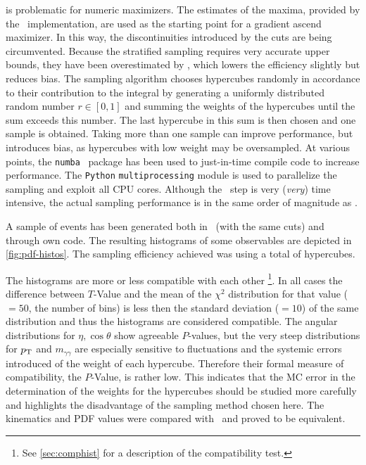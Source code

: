is problematic for numeric maximizers.  The estimates of the maxima,
provided by the \vegas\ implementation, are used as the starting point
for a gradient ascend maximizer. In this way, the discontinuities
introduced by the cuts are being circumvented. Because the stratified
sampling requires very accurate upper bounds, they have been
overestimated by \!, which lowers
the efficiency slightly but reduces bias. The sampling algorithm
chooses hypercubes randomly in accordance to their contribution to the
integral by generating a uniformly distributed random number
\(r\in [0,1]\) and summing the weights of the hypercubes until the sum
exceeds this number. The last hypercube in this sum is then chosen and
one sample is obtained. Taking more than one sample can improve
performance, but introduces bias, as hypercubes with low weight may be
oversampled. At various points, the \texttt{numba}~\cite{lam2015:po}
package has been used to just-in-time compile code to increase
performance. The \texttt{Python} \texttt{multiprocessing} module is
used to parallelize the sampling and exploit all CPU cores. Although
the \vegas\ step is very (\emph{very}) time intensive, the actual
sampling performance is in the same order of magnitude as \sherpa.

A sample of  events has been
generated both in \sherpa\ (with the same cuts) and through own
code. The resulting histograms of some observables are depicted in
\cref{fig:pdf-histos}. The sampling efficiency achieved was
 using a total of
 hypercubes.

The histograms are more or less compatible with each other
\footnote{See \cref{sec:comphist} for a description of the
  compatibility test.}. In all cases the difference between
\(T\)-Value and the mean of the \(\chi^2\) distribution for that value
(\(=50\), the number of bins) is less then the standard deviation
(\(=10\)) of the same distribution and thus the histograms are
considered compatible. The angular distributions for
\(\eta, \cos\theta\) show agreeable \(P\)-values, but the very steep
distributions for \(p_\mathrm{T}\) and \(m_{\gamma\gamma}\) are especially
sensitive to fluctuations and the systemic errors introduced of the
weight of each hypercube. Therefore their formal measure of
compatibility, the \(P\)-Value, is rather low. This indicates that the
MC error in the determination of the weights for the hypercubes should
be studied more carefully and highlights the disadvantage of the
sampling method chosen here. The kinematics and PDF values were
compared with \sherpa\ and proved to be equivalent.


